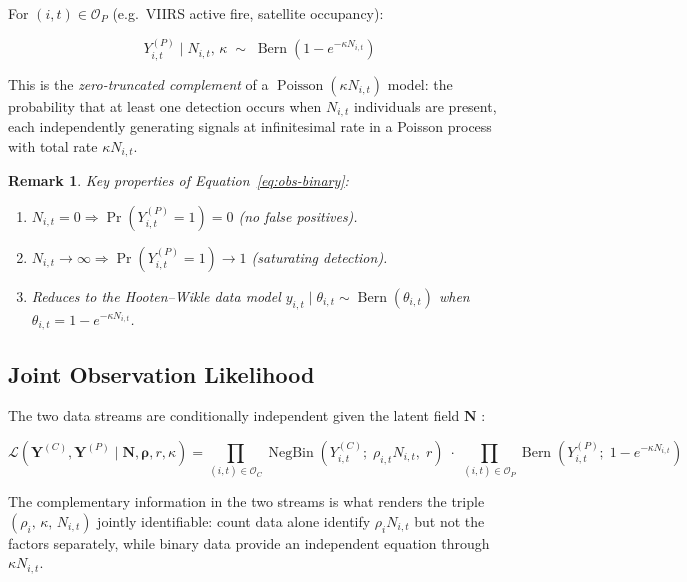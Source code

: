 \documentclass[12pt,a4paper]{article}
\newtheorem{remark}{Remark}
\theoremstyle{definition}
\newcommand{\Bern}{\operatorname{Bern}}
\newcommand{\Pois}{\operatorname{Poisson}}
\newcommand{\NB}{\operatorname{NegBin}}
\newcommand{\OC}{\mathcal{O}_C}
\newcommand{\OP}{\mathcal{O}_P}
\begin{document}
For $(i,t) \in \OP$ (e.g.\ VIIRS active fire, satellite occupancy):

\begin{equation}
  Y_{i,t}^{(P)} \;\Big|\; N_{i,t},\, \kappa
  \;\sim\; \Bern\!\left(1 - e^{-\kappa N_{i,t}}\right)
  \label{eq:obs-binary}
\end{equation}

This is the \emph{zero-truncated complement} of a $\Pois(\kappa N_{i,t})$
model: the probability that at least one detection occurs when $N_{i,t}$
individuals are present, each independently generating signals at infinitesimal
rate in a Poisson process with total rate $\kappa N_{i,t}$.

\begin{remark}
Key properties of Equation~\eqref{eq:obs-binary}:
\begin{enumerate}[noitemsep]
  \item $N_{i,t}=0 \Rightarrow \Pr(Y_{i,t}^{(P)}=1)=0$ (no false positives).
  \item $N_{i,t}\to\infty \Rightarrow \Pr(Y_{i,t}^{(P)}=1)\to 1$ (saturating detection).
  \item Reduces to the Hooten--Wikle data model $y_{i,t}\mid\theta_{i,t}\sim\Bern(\theta_{i,t})$
        when $\theta_{i,t} = 1 - e^{-\kappa N_{i,t}}$.
\end{enumerate}
\end{remark}

\subsection{Joint Observation Likelihood}

The two data streams are conditionally independent given the latent field
$\mathbf{N}$ \citep{verhoef2025}:

\begin{keybox}
\begin{equation}
  \mathcal{L}\!\left(\mathbf{Y}^{(C)}, \mathbf{Y}^{(P)}
    \mid \mathbf{N}, \boldsymbol{\rho}, r, \kappa\right)
  =
  \prod_{(i,t)\in\OC} \NB\!\left(Y_{i,t}^{(C)};\; \rho_{i,t} N_{i,t},\; r\right)
  \;\cdot\;
  \prod_{(i,t)\in\OP} \Bern\!\left(Y_{i,t}^{(P)};\; 1-e^{-\kappa N_{i,t}}\right)
  \label{eq:joint-likelihood}
\end{equation}
\end{keybox}

\noindent
The complementary information in the two streams is what renders the triple
$(\rho_i,\, \kappa,\, N_{i,t})$ jointly identifiable: count data alone identify
$\rho_i N_{i,t}$ but not the factors separately, while binary data provide an
independent equation through $\kappa N_{i,t}$.
\end{document}

